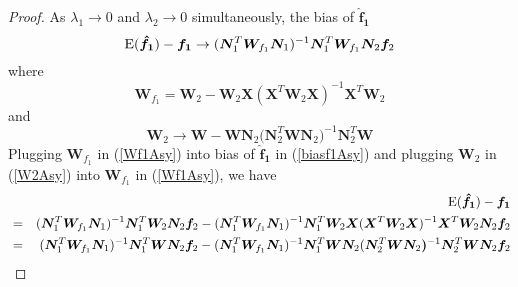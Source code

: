 \documentclass[article,lineno]{biometrika}
\begin{document}
\begin{proof}
As $\lambda_1 \to 0$ and $\lambda_2 \to 0$ simultaneously, the bias of $\bm {\hat f_1}$  
\begin{equation} \label{biasf1Asy}
{\rm E}(\boldsymbol {\hat f_1}) - \boldsymbol { f_1}
\to
(\boldsymbol N_1^T \boldsymbol W_{f_1}  \boldsymbol N_1)^{-1}  
\boldsymbol N_1^T \boldsymbol W_{f_1}
\boldsymbol N_2 \boldsymbol f_2
\end{equation}
where
\begin{equation} \label{Wf1Asy}
\boldsymbol W_{f_1} 
=
\boldsymbol W_2 - \boldsymbol W_2\boldsymbol X(\boldsymbol X^T  \boldsymbol W_2\boldsymbol X)^{-1}  \boldsymbol X^T  \boldsymbol W_2 
\end{equation}
and
\begin{equation} \label{W2Asy}
\boldsymbol W_2 \to
 \boldsymbol W 
 -
\boldsymbol W \boldsymbol N_2 
 (\boldsymbol N_2^T  \boldsymbol W \boldsymbol N_2 \boldsymbol)^{-1} 
 \boldsymbol N_2^T  \boldsymbol W
\end{equation}
Plugging $\bm W_{f_1}$ in (\ref{Wf1Asy}) into bias of $\bm {\hat f_1}$ in (\ref{biasf1Asy}) and plugging $\bm W_2$ in (\ref{W2Asy}) into $\bm W_{f_1}$ in (\ref{Wf1Asy}), we have 
\begin{eqnarray*}
&& 
{\rm E}(\boldsymbol {\hat f_1}) - \boldsymbol { f_1}\\
&=& 
(\boldsymbol N_1^T \boldsymbol W_{f_1}  \boldsymbol N_1)^{-1}  
\boldsymbol N_1^T 
\boldsymbol W_2 \boldsymbol N_{2} \boldsymbol f_2
-
(\boldsymbol N_1^T \boldsymbol W_{f_1}  \boldsymbol N_1)^{-1}  \boldsymbol N_1^T 
\boldsymbol W_2 \boldsymbol X(\boldsymbol X^T  \boldsymbol W_2\boldsymbol X)^{-1}  \boldsymbol X^T  \boldsymbol W_2
\boldsymbol N_2 \boldsymbol f_2\\
&=& 
(\boldsymbol N_1^T \boldsymbol W_{f_1}  \boldsymbol N_1)^{-1}  \boldsymbol N_1^T 
\boldsymbol W\boldsymbol N_{2} \boldsymbol f_2
 -
 (\boldsymbol N_1^T \boldsymbol W_{f_1}  \boldsymbol N_1)^{-1}  \boldsymbol N_1^T 
\boldsymbol W \boldsymbol N_2 
 (\boldsymbol N_2^T  \boldsymbol W \boldsymbol N_2 \boldsymbol)^{-1} 
 \boldsymbol N_2^T  \boldsymbol W \boldsymbol N_{2} \boldsymbol f_2\\

\end{eqnarray*}
\end{proof}
\end{document}
